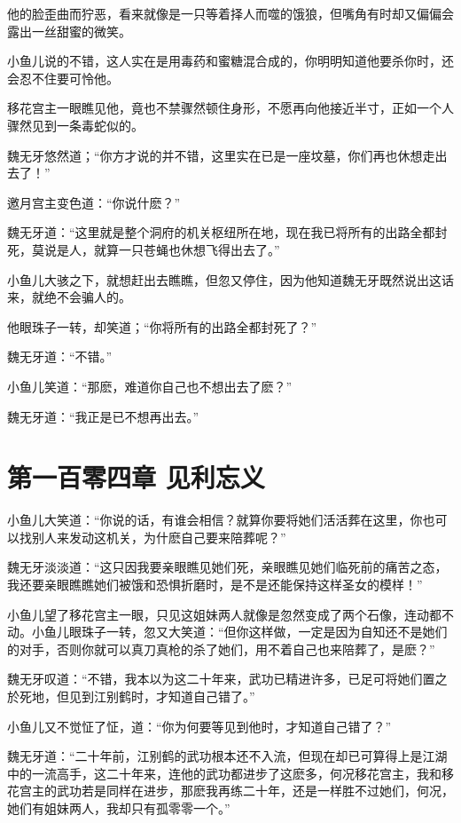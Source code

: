 \documentclass[12pt,oneside]{book}
\begin{document}
他的脸歪曲而狞恶，看来就像是一只等着择人而噬的饿狼，但嘴角有时却又偏偏会露出一丝甜蜜的微笑。

小鱼儿说的不错，这人实在是用毒药和蜜糖混合成的，你明明知道他要杀你时，还会忍不住要可怜他。

移花宫主一眼瞧见他，竟也不禁骤然顿住身形，不愿再向他接近半寸，正如一个人骤然见到一条毒蛇似的。

魏无牙悠然道；``你方才说的并不错，这里实在已是一座坟墓，你们再也休想走出去了！''

邀月宫主变色道：``你说什麽？''

魏无牙道：``这里就是整个洞府的机关枢纽所在地，现在我已将所有的出路全都封死，莫说是人，就算一只苍蝇也休想飞得出去了。''

小鱼儿大骇之下，就想赶出去瞧瞧，但忽又停住，因为他知道魏无牙既然说出这话来，就绝不会骗人的。

他眼珠子一转，却笑道；``你将所有的出路全都封死了？''

魏无牙道：``不错。''

小鱼儿笑道：``那麽，难道你自己也不想出去了麽？''

魏无牙道：``我正是已不想再出去。''

\hypertarget{ux7b2cux4e00ux767eux96f6ux56dbux7ae0-ux89c1ux5229ux5fd8ux4e49}{%
\chapter{第一百零四章
见利忘义}\label{ux7b2cux4e00ux767eux96f6ux56dbux7ae0-ux89c1ux5229ux5fd8ux4e49}}

小鱼儿大笑道：``你说的话，有谁会相信？就算你要将她们活活葬在这里，你也可以找别人来发动这机关，为什麽自己要来陪葬呢？''

魏无牙淡淡道：``这只因我要亲眼瞧见她们死，亲眼瞧见她们临死前的痛苦之态，我还要亲眼瞧瞧她们被饿和恐惧折磨时，是不是还能保持这样圣女的模样！''

小鱼儿望了移花宫主一眼，只见这姐妹两人就像是忽然变成了两个石像，连动都不动。小鱼儿眼珠子一转，忽又大笑道：``但你这样做，一定是因为自知还不是她们的对手，否则你就可以真刀真枪的杀了她们，用不着自己也来陪葬了，是麽？''

魏无牙叹道：``不错，我本以为这二十年来，武功已精进许多，已足可将她们置之於死地，但见到江别鹤时，才知道自己错了。''

小鱼儿又不觉怔了怔，道：``你为何要等见到他时，才知道自己错了？''

魏无牙道：``二十年前，江别鹤的武功根本还不入流，但现在却已可算得上是江湖中的一流高手，这二十年来，连他的武功都进步了这麽多，何况移花宫主，我和移花宫主的武功若是同样在进步，那麽我再练二十年，还是一样胜不过她们，何况，她们有姐妹两人，我却只有孤零零一个。''
\end{document}
